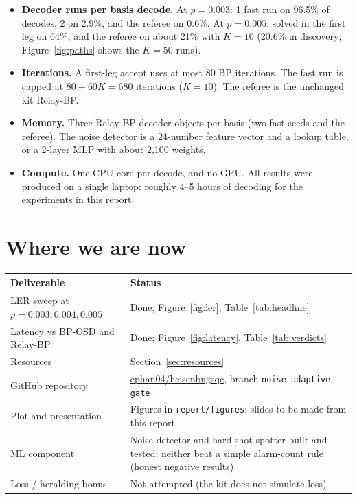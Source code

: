 \documentclass[11pt]{article}
\begin{document}
\begin{itemize}
  \item \textbf{Decoder runs per basis decode.} At $p=0.003$: 1 fast run on 96.5\% of decodes, 2 on 2.9\%, and the
        referee on 0.6\%. At $p=0.005$: solved in the first leg on 64\%, and the referee on about 21\% with $K=10$ (20.6\% in discovery; Figure~\ref{fig:paths} shows the $K=50$ runs).
  \item \textbf{Iterations.} A first-leg accept uses at most 80 BP iterations. The fast run is capped at $80+60K = 680$ iterations ($K=10$).
        The referee is the unchanged kit Relay-BP.
  \item \textbf{Memory.} Three Relay-BP decoder objects per basis (two fast seeds and the referee). The noise detector is a 24-number feature vector
        and a lookup table, or a 2-layer MLP with about 2,100 weights.
  \item \textbf{Compute.} One CPU core per decode, and no GPU. All results were produced on a single laptop: roughly 4--5 hours of
        decoding for the experiments in this report.
\end{itemize}


\section{Where we are now}\label{sec:status}

\begin{table}[H]
\centering\small
\begin{tabular}{p{}p{}}
\toprule
Deliverable & Status\\
\midrule
LER sweep at $p=0.003, 0.004, 0.005$ & Done; Figure~\ref{fig:ler}, Table~\ref{tab:headline}\\
Latency vs BP-OSD and Relay-BP & Done; Figure~\ref{fig:latency}, Table~\ref{tab:verdicts}\\
Resources & Section~\ref{sec:resources}\\
GitHub repository & \href{https://github.com/ephan04/heisenbugsqc}{ephan04/heisenbugsqc}, branch \texttt{noise-adaptive-gate}\\
Plot and presentation & Figures in \texttt{report/figures}; slides to be made from this report\\
ML component & Noise detector and hard-shot spotter built and tested; neither beat a simple alarm-count rule (honest negative results)\\
Loss / heralding bonus & Not attempted (the kit does not simulate loss)\\
\bottomrule
\end{tabular}
\end{table}
\end{document}
